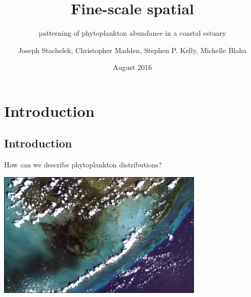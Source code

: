 \documentclass[compress,noflama,nosectionpages]{beamer}
\title{\nohyphens{Fine-scale spatial}}
\subtitle{\nohyphens{patterning of phytoplankton abundance in a coastal estuary}}
\date{August 2016}
\author{{\Medium Joseph Stachelek}, Christopher Madden, Stephen P. Kelly, Michelle Blaha}
\institute{South Florida Water Management District\\ {\Medium Everglades Division}}
\begin{document}

\maketitle



\section{Introduction}
\subsection{Introduction}
\begin{frame}{How can we describe phytoplankton distributions?}

\includegraphics[height=6cm,keepaspectratio=true]{images/landsat_border.jpg}\\

\end{frame}
\end{document}
